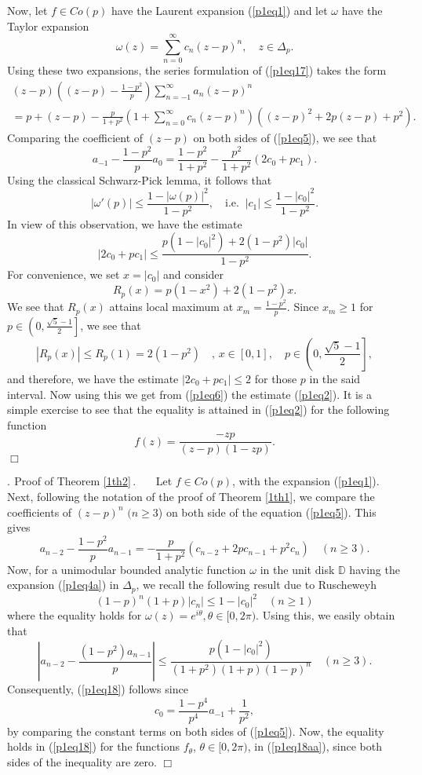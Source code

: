 \documentclass[leqno,
12pt]{amsart}
\theoremstyle{definition}
\newcounter {own}
\newenvironment{nonsec}{\bf
\setcounter{own}{\value{equation}}\addtocounter{equation}{1}
\refstepcounter{own}
\bigskip

\indent {\thesection       .\arabic{own}}.$\ \,$}{$\,$.\ \ \ }
\begin{document}
Now, let $f\in Co(p)$ have the Laurent expansion (\ref{p1eq1}) and let
$\omega$ have the Taylor expansion
\begin{equation}\label{p1eq4a}
\omega(z)=\sum_{n=0}^{\infty}c_n(z-p)^n, \quad z\in\Delta_p.
\end{equation}
Using these two expansions, the series formulation of (\ref{p1eq17}) takes
the form
\begin{eqnarray} \label{p1eq5}
(z-p)\left ((z-p)-\frac{1-p^2}{p}\right )\sum_{n=-1}^{\infty}a_n(z-p)^n \hspace{3cm}\\
= p+(z-p)-\frac{p}{1+p^2}\left (1+\sum_{n=0}^{\infty}c_n(z-p)^n
\right)\left((z-p)^2+2p(z-p)+p^2\right ).\nonumber
\end{eqnarray}
Comparing  the coefficient of $(z-p)$  on both sides of (\ref{p1eq5}), we see that
\begin{equation}\label{p1eq6}
a_{-1}-\frac{1-p^2}{p}a_0 = \frac{1-p^2}{1+p^2}-\frac{p^2}{1+p^2}(2c_0+pc_1).
\end{equation}
Using the classical Schwarz-Pick lemma, it follows that
$$
|\omega'(p)|\leq \frac{1-|\omega (p)|^2}{1-p^2},\quad \mbox{i.e. }~|c_1|\leq \frac{1-|c_0|^2}{1-p^2}.
$$
In view of this observation, we have the estimate
$$
|2c_0+pc_1|\leq \frac{p(1-|c_0|^2)+2(1-p^2)|c_0|}{1-p^2}.
$$
For convenience, we set $x=|c_0|$ and consider
$$R_p(x)=p(1-x^2)+2(1-p^2)x.
$$
We see that $R_p(x)$ attains local maximum at $x_m=\frac{1-p^2}{p}$. Since
$x_m \geq 1$ for $p\in \left(0,\frac{\sqrt 5-1}{2}\right]$,
we see that
$$
|R_p(x)|\leq R_p(1)= 2(1-p^2)\quad, \, x\in[0,1],\quad p\in\left(0,\frac{\sqrt 5-1}{2}\right],
$$
and therefore, we have the estimate $|2c_0+pc_1|\leq 2$ for those $p$ in the said
interval. Now using this we get
from (\ref{p1eq6}) the  estimate (\ref{p1eq2}).
It is a simple exercise to see that the
equality is attained in (\ref{p1eq2}) for the following function
$$
f(z)=\frac{-zp}{(z-p)(1-zp)}.
$$
\hfill $\Box$

\begin{nonsec}Proof of Theorem \ref{1th2}\end{nonsec}
Let $f\in Co(p)$, with the expansion (\ref{p1eq1}).
Next, following the notation of the proof of Theorem \ref{1th1},
we compare the coefficients of $(z-p)^n$ $(n\geq 3$) on both side of
the equation (\ref{p1eq5}). This gives
$$a_{n-2}-\frac{1-p^2}{p}a_{n-1}=-\frac{p}{1+p^2}(c_{n-2}+2p c_{n-1}+p^2c_n)
\quad \mbox{$(n\geq 3)$}.
$$
Now, for a unimodular bounded analytic function $\omega$ in the unit disk ${{\mathbb D}}$
having the expansion (\ref{p1eq4a}) in $\Delta_p$, we recall the following
result due to Ruscheweyh \cite[Theorem 2]{Rus-89}
$$
(1-p)^n(1+p)|c_n|\leq 1-|c_0|^2  \quad (n\geq 1)
$$
where the equality holds for $\omega(z)=e^{i\theta}, \theta\in[0,2\pi)$.
Using this, we easily obtain that
$$
\left|a_{n-2}-\frac{(1-p^2)a_{n-1}}{p}\right|
\leq \frac{p(1-|c_0|^2)}{(1+p^2)(1+p)(1-p)^n} \quad (n\geq 3).
$$
Consequently, (\ref{p1eq18}) follows since
$$
c_0=\frac{1-p^4}{p^4}a_{-1}+\frac{1}{p^2},
$$
by comparing  the constant terms on both sides of (\ref{p1eq5}).
Now, the equality holds in (\ref{p1eq18}) for the functions $f_\theta$,
$\theta\in [0, 2\pi)$,
in (\ref{p1eq18aa}), since both sides of the inequality are zero.
\hfill $\Box$
\end{document}
